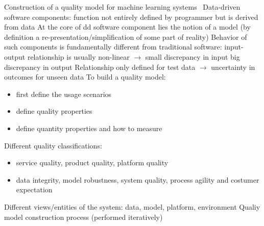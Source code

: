 Construction of a quality model for machine learning systems~\cite{siebert_construction_2021}
Data-driven software components: function not entirely defined by programmer but is derived from data
At the core of dd software component lies the notion of a model (by definition a
re-presentation/simplification of some part of reality)
Behavior of such components is fundamentally different from traditional software: input-output
relationship is usually non-linear $\rightarrow$ small discrepancy in input big discrepancy in output
Relationship only defined for test data $\rightarrow$ uncertainty in outcomes for unseen data
To build a quality model:
\begin{itemize}
    \item first define the usage scenarios
    \item define quality properties
    \item define quantity properties and how to measure
\end{itemize}
Different quality classifications:
\begin{itemize}
    \item service quality, product quality, platform quality
    \item data integrity, model robustness, system quality, process agility and costumer expectation
\end{itemize}
Different views/entities of the system: data, model, platform, environment
Qualiy model construction process (performed iteratively)
